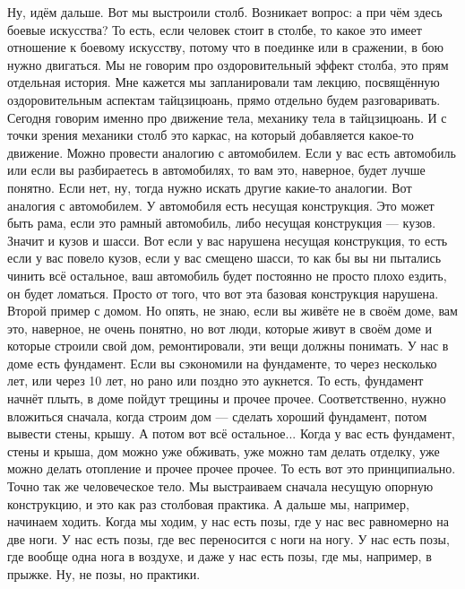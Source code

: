 Ну, идём дальше. Вот мы выстроили столб.
Возникает вопрос: а при чём здесь боевые искусства? То есть, если человек стоит в столбе,
то какое это имеет отношение к боевому искусству, потому что в поединке или в сражении, в бою
нужно двигаться. Мы не говорим про оздоровительный эффект столба, это прям отдельная история.
Мне кажется мы запланировали там лекцию, посвящённую оздоровительным аспектам тайцзицюань,
прямо отдельно будем разговаривать. Сегодня говорим именно про движение тела, механику тела в
тайцзицюань. И с точки зрения механики столб это каркас, на который добавляется какое-то
движение. Можно провести аналогию с автомобилем.
Если у вас есть автомобиль или если вы разбираетесь в автомобилях, то вам это,
наверное, будет лучше понятно. Если нет, ну, тогда нужно искать другие какие-то аналогии. Вот
аналогия с автомобилем. У автомобиля есть несущая конструкция. Это может быть рама, если
это рамный автомобиль, либо несущая конструкция --- кузов. Значит и кузов и шасси. Вот если у вас
нарушена несущая конструкция, то есть если у вас повело кузов, если у вас смещено шасси, то как
бы вы ни пытались чинить всё остальное, ваш автомобиль будет постоянно не просто плохо ездить,
он будет ломаться. Просто от того, что вот эта базовая конструкция нарушена.
Второй пример с домом. Но опять, не знаю, если вы
живёте не в своём доме, вам это, наверное, не очень понятно, но вот люди, которые живут в своём
доме и которые строили свой дом, ремонтировали, эти вещи должны понимать. У нас в доме есть
фундамент. Если вы сэкономили на фундаменте, то через несколько лет, или через 10 лет, но рано или
поздно это аукнется. То есть, фундамент начнёт плыть,
в доме пойдут трещины и прочее прочее. Соответственно, нужно вложиться сначала, когда
строим дом --- сделать хороший фундамент, потом вывести стены, крышу. А потом вот всё
остальное... Когда у вас есть фундамент, стены и крыша, дом можно уже обживать, уже можно там делать
отделку, уже можно делать отопление и прочее прочее прочее. То есть вот это принципиально.
Точно
так же человеческое тело. Мы выстраиваем сначала несущую опорную конструкцию, и это как раз
столбовая практика. А дальше мы, например, начинаем ходить. Когда мы ходим, у нас есть позы,
где у нас вес равномерно на две ноги. У нас есть позы, где вес переносится с ноги на ногу. У
нас есть позы, где вообще одна нога в воздухе, и даже у нас есть позы, где мы, например, в
прыжке. Ну, не позы, но практики.

